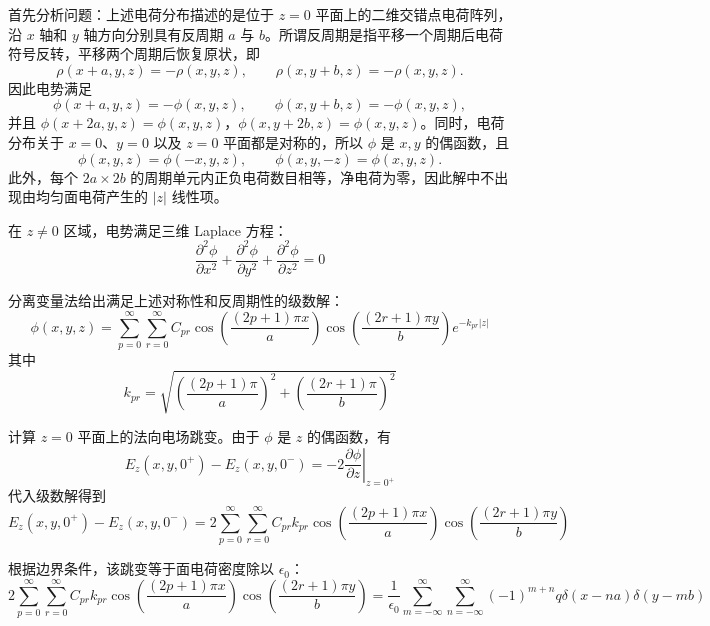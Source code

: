\documentclass[11pt,a4paper]{ctexart}
\begin{document}
\bigskip

首先分析问题：上述电荷分布描述的是位于 $z=0$ 平面上的二维交错点电荷阵列，沿 $x$ 轴和 $y$ 轴方向分别具有反周期 $a$ 与 $b$。所谓反周期是指平移一个周期后电荷符号反转，平移两个周期后恢复原状，即
\[
\rho(x+a,y,z)=-\rho(x,y,z),\qquad \rho(x,y+b,z)=-\rho(x,y,z).
\]
因此电势满足
\[
\phi(x+a,y,z)=-\phi(x,y,z),\qquad \phi(x,y+b,z)=-\phi(x,y,z),
\]
并且 $\phi(x+2a,y,z)=\phi(x,y,z)$，$\phi(x,y+2b,z)=\phi(x,y,z)$。同时，电荷分布关于 $x=0$、$y=0$ 以及 $z=0$ 平面都是对称的，所以 $\phi$ 是 $x,y$ 的偶函数，且
\[
\phi(x,y,z)=\phi(-x,y,z),\qquad \phi(x,y,-z)=\phi(x,y,z).
\]
此外，每个 $2a\times 2b$ 的周期单元内正负电荷数目相等，净电荷为零，因此解中不出现由均匀面电荷产生的 $\left|z\right|$ 线性项。

\bigskip

在 $z\neq 0$ 区域，电势满足三维 Laplace 方程：
\begin{equation}
    \frac{\partial^2\phi}{\partial x^2}+\frac{\partial^2\phi}{\partial y^2}+\frac{\partial^2\phi}{\partial z^2}=0
    \label{eq:Laplace2}
\end{equation}

分离变量法给出满足上述对称性和反周期性的级数解：
\begin{equation}
    \phi(x,y,z)=\sum_{p=0}^{\infty}\sum_{r=0}^{\infty}C_{pr}\cos\left(\frac{(2p+1)\pi x}{a}\right)\cos\left(\frac{(2r+1)\pi y}{b}\right)e^{-k_{pr}\left|z\right|}
    \label{eq:solution2}
\end{equation}
其中
\begin{equation}
    k_{pr}=\sqrt{\left(\frac{(2p+1)\pi}{a}\right)^2+\left(\frac{(2r+1)\pi}{b}\right)^2}
    \label{eq:kpr}
\end{equation}

计算 $z=0$ 平面上的法向电场跳变。由于 $\phi$ 是 $z$ 的偶函数，有
\begin{equation}
    E_z(x,y,0^+)-E_z(x,y,0^-)=-2\left.\frac{\partial\phi}{\partial z}\right|_{z=0^+}
    \label{eq:Ez_jump2}
\end{equation}
代入级数解得到
\begin{equation}
    E_z(x,y,0^+)-E_z(x,y,0^-)
    =2\sum_{p=0}^{\infty}\sum_{r=0}^{\infty}C_{pr}k_{pr}\cos\left(\frac{(2p+1)\pi x}{a}\right)\cos\left(\frac{(2r+1)\pi y}{b}\right)
    \label{eq:Ez_jump2_expanded}
\end{equation}

根据边界条件，该跳变等于面电荷密度除以 $\epsilon_0$：
\begin{equation}
    2\sum_{p=0}^{\infty}\sum_{r=0}^{\infty}C_{pr}k_{pr}\cos\left(\frac{(2p+1)\pi x}{a}\right)\cos\left(\frac{(2r+1)\pi y}{b}\right)
    =\frac{1}{\epsilon_0}\sum_{m=-\infty}^{\infty}\sum_{n=-\infty}^{\infty}(-1)^{m+n}q\delta(x-na)\delta(y-mb)
    \label{eq:boundary_condition2}
\end{equation}
\end{document}
